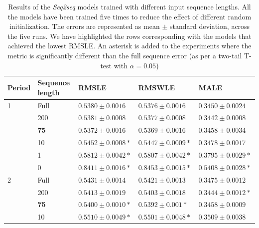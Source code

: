 \documentclass{elsarticle}
\begin{document}
		\begin{table}[!h]
		\footnotesize
		\caption{Results of the \textit{Seq2seq} models trained with different input sequence lengths. All the models have been trained five times to reduce the effect of different random initialization. The errors are represented as mean $\pm$ standard deviation, across the five runs. We have highlighted the rows corresponding with the models that achieved the lowest RMSLE. An asterisk is added to the experiments where the metric is significantly different than the full sequence error (as per a two-tail T-test with $\alpha=0.05$)}
		\label{tab:results_ablation_length}
		\centering
		\begin{tabular}{lllll}
			\hline
			Period & Sequence length & RMSLE                           & RMSWLE                         & MALE                           \\ \hline
			1      & Full            & $ 0.5380 \pm 0.0016 $           & $ 0.5376 \pm 0.0016 $          & $  0.3450 \pm 0.0024$          \\
			       & 200             & $ 0.5381 \pm 0.0008 $           & $ 0.5377 \pm 0.0008 $          & $ 0.3442 \pm 0.0008 $          \\
			       & \textbf{75}     & $ \mathbf{0.5372 \pm 0.0016} $  & $ \mathbf{0.5369 \pm 0.0016} $ & $ \mathbf{0.3458 \pm 0.0034} $ \\
			       & 10              & $ 0.5452 \pm 0.0008 *$          & $ 0.5447 \pm 0.0009 *$         & $ 0.3478 \pm 0.0017 $          \\
			       & 1               & $ 0.5812 \pm 0.0042 *$          & $ 0.5807 \pm 0.0042 *$         & $ 0.3795 \pm 0.0029 *$          \\
			       & 0               & $ 0.8411 \pm 0.0016 *$          & $ 0.8453 \pm 0.0015 *$         & $ 0.5408 \pm 0.0028 *$          \\ \hline
			2      & Full            & $ 0.5431 \pm 0.0014 $           & $ 0.5421 \pm 0.0013 $          & $ 0.3475 \pm 0.0012 $          \\
			       & 200             & $ 0.5413 \pm 0.0019 $           & $ 0.5403 \pm 0.0018 $          & $ 0.3444 \pm 0.0012 *$          \\
			       & \textbf{75}     & $ \mathbf{0.5400 \pm 0.0010}* $ & $ \mathbf{0.5392 \pm 0.001}* $ & $ \mathbf{0.3458 \pm 0.0009} $ \\
			       & 10              & $ 0.5510 \pm 0.0049 *$          & $ 0.5501 \pm 0.0048 *$         & $ 0.3509 \pm 0.0038 $          \\

\end{tabular}
\end{table}
\end{document}

